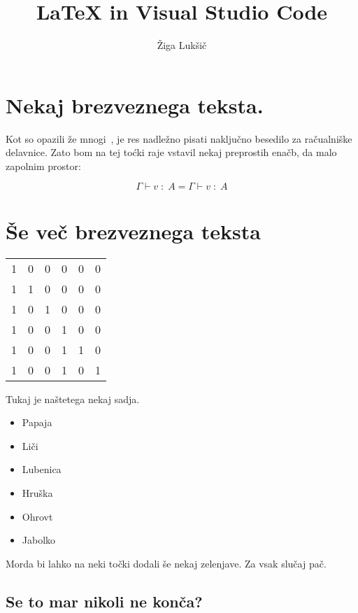 \documentclass{article}
\title{LaTeX in Visual Studio Code}
\author{Žiga Lukšič}
\newcommand{\todo}[1]{{\color{red}{#1}}}
\newcommand{\ctx}{\Gamma}
\newcommand{\oftype}{\;:\;}
\newcommand{\tyA}{A}
\newcommand{\judgement}[3][\ctx]{#1 \vdash #2 \oftype #3}
\begin{document}
\maketitle

\section{Nekaj brezveznega teksta.}

Kot so opazili že mnogi~\cite{DBLP:journals/entcs/Pretnar15,DBLP:journals/jlp/BauerP15}, je res nadležno pisati naključno besedilo za račualniške delavnice. Zato bom na tej toćki raje vstavil nekaj preprostih enačb, da malo zapolnim prostor:

\[
  \judgement{v}{\tyA} = \judgement[\ctx]{v}{\tyA}
\]

\section{Še več brezveznega teksta}

\begin{tabular}{c|c|c|c|c|c}
  1 & 0 & 0 & 0 & 0 & 0 \\
  1 & 1 & 0 & 0 & 0 & 0 \\
  1 & 0 & 1 & 0 & 0 & 0 \\
  1 & 0 & 0 & 1 & 0 & 0 \\
  1 & 0 & 0 & 1 & 1 & 0 \\
  1 & 0 & 0 & 1 & 0 & 1 \\
\end{tabular}

Tukaj je naštetega nekaj sadja.

\begin{itemize}
  \item Papaja
  \item Liči
  \item Lubenica
  \item Hruška
  \item Ohrovt \todo{(???)}
  \item Jabolko
\end{itemize}

Morda bi lahko na neki točki dodali še nekaj zelenjave. Za vsak slučaj pač.

\newpage

\subsection{Se to mar nikoli ne konča?}\cite{}
\end{document}
